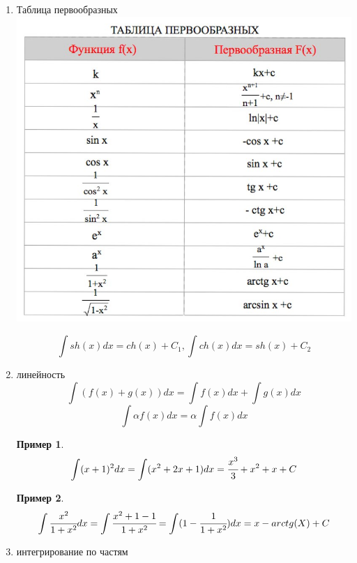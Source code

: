 \documentclass[a4paper]{article}
\theoremstyle{definition}
\newtheorem*{exmp}{Пример}
\newtheorem*{comment}{Замечание}
\numberwithin{theorem}{subsection}
\numberwithin{lemma}{subsection}
\numberwithin{definition}{subsection}
\numberwithin{comment*}{subsection}
\numberwithin{consequence}{subsection}
\numberwithin{property}{subsection}
\begin{document}
\begin{enumerate}

 \item Таблица первообразных\\
       \includegraphics{pervoobraz}

       $$\int sh(x)dx = ch(x)+C_1, \int ch(x)dx = sh(x)+C_2$$

 \item линейность
       $$ \int (f(x) + g(x))dx = \int f(x)dx + \int g(x)dx$$
       $$ \int \alpha f(x) dx = \alpha \int f(x)dx$$
       \begin{exmp}
        $$ \int (x+1)^2 dx = \int (x^2 + 2x + 1)dx = \cfrac{x^3}{3} + x^2 + x + C $$
       \end{exmp}
       \begin{exmp}
        $$ \int \cfrac{x^2}{1+x^2} dx = \int \cfrac{x^2 + 1 -1}{1+x^2} = \int (1 - \cfrac{1}{1+x^2})dx = x - arctg(X) + C $$
       \end{exmp}
 \item интегрирование по частям


\end{enumerate}
\end{document}
